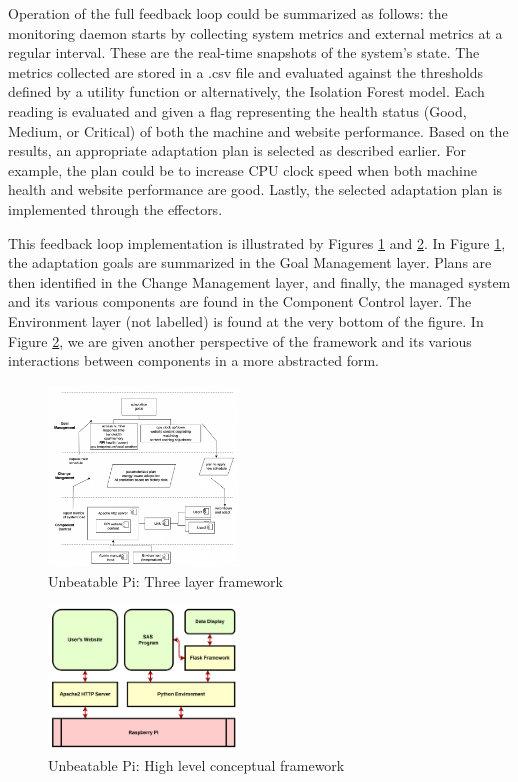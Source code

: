\documentclass[conference]{IEEEtran}
\begin{document}
Operation of the full feedback loop could be summarized as follows: the monitoring daemon starts by collecting system metrics and external metrics at a regular interval. These are the real-time snapshots of the system's state. The metrics collected are stored in a .csv file and evaluated against the thresholds defined by a utility function or alternatively, the Isolation Forest model. Each reading is evaluated and given a flag representing the health status (Good, Medium, or Critical) of both the machine and website performance. Based on the results, an appropriate adaptation plan is selected as described earlier. For example, the plan could be to increase CPU clock speed when both machine health and website performance are good. Lastly, the selected adaptation plan is implemented through the effectors.

This feedback loop implementation is illustrated by Figures \ref{fig:three_layer_framework} and \ref{fig:high_level_framework}. In Figure \ref{fig:three_layer_framework}, the adaptation goals are summarized in the Goal Management layer. Plans are then identified in the Change Management layer, and finally, the managed system and its various components are found in the Component Control layer. The Environment layer (not labelled) is found at the very bottom of the figure. In Figure \ref{fig:high_level_framework}, we are given another perspective of the framework and its various interactions between components in a more abstracted form.

\begin{figure}[H]
    \centering
    \includegraphics[width=0.45\textwidth]{./media/three_layer_framework.png}
    \caption{Unbeatable Pi: Three layer framework}
    \label{fig:three_layer_framework}
\end{figure}

\begin{figure}[H]
    \centering
    \includegraphics[width=0.45\textwidth]{./media/high_level_framework.png}
    \caption{Unbeatable Pi: High level conceptual framework}
    \label{fig:high_level_framework}
\end{figure}
\end{document}
